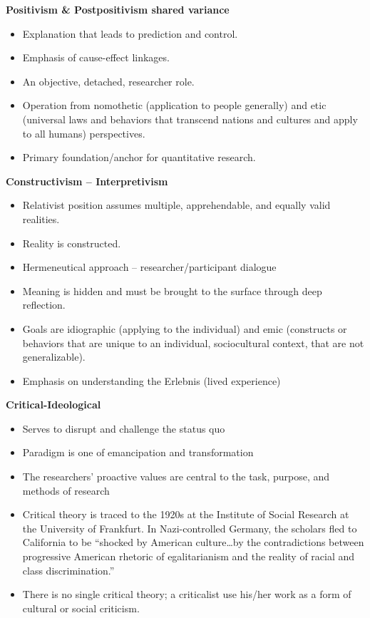 \documentclass[
  english,
]{book}
\providecommand{\tightlist}{%
  \setlength{\itemsep}{0pt}\setlength{\parskip}{0pt}}
\begin{document}
\textbf{Positivism \& Postpositivism shared variance}

\begin{itemize}
\tightlist
\item
  Explanation that leads to prediction and control.
\item
  Emphasis of cause-effect linkages.
\item
  An objective, detached, researcher role.
\item
  Operation from nomothetic (application to people generally) and etic (universal laws and behaviors that transcend nations and cultures and apply to all humans) perspectives.
\item
  Primary foundation/anchor for quantitative research.
\end{itemize}

\textbf{Constructivism -- Interpretivism}

\begin{itemize}
\tightlist
\item
  Relativist position assumes multiple, apprehendable, and equally valid realities.
\item
  Reality is constructed.
\item
  Hermeneutical approach -- researcher/participant dialogue
\item
  Meaning is hidden and must be brought to the surface through deep reflection.
\item
  Goals are idiographic (applying to the individual) and emic (constructs or behaviors that are unique to an individual, sociocultural context, that are not generalizable).
\item
  Emphasis on understanding the Erlebnis (lived experience)
\end{itemize}

\textbf{Critical-Ideological}

\begin{itemize}
\tightlist
\item
  Serves to disrupt and challenge the status quo
\item
  Paradigm is one of emancipation and transformation
\item
  The researchers' proactive values are central to the task, purpose, and methods of research
\item
  Critical theory is traced to the 1920s at the Institute of Social Research at the University of Frankfurt. In Nazi-controlled Germany, the scholars fled to California to be ``shocked by American culture\ldots by the contradictions between progressive American rhetoric of egalitarianism and the reality of racial and class discrimination.''
\item
  There is no single critical theory; a criticalist use his/her work as a form of cultural or social criticism.
\end{itemize}
\end{document}
